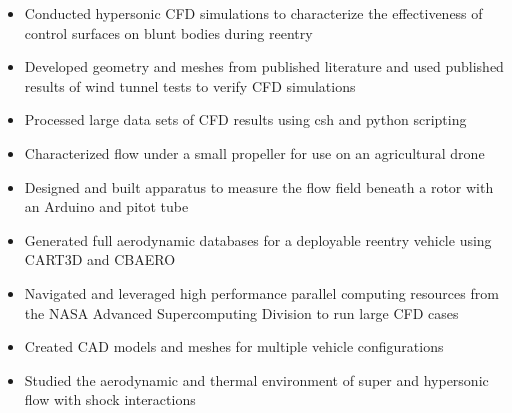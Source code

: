 \documentclass[10pt,ragged2e]{altacv}
\begin{document}

\begin{fullwidth}
  \makecvheader
\end{fullwidth}



\begin{itemize}
  \item Conducted hypersonic CFD simulations to characterize the effectiveness of control surfaces on blunt bodies during reentry
  \item Developed geometry and meshes from published literature and used published results of wind tunnel tests to verify CFD simulations
  \item Processed large data sets of CFD results using csh and python scripting

\end{itemize}

\begin{itemize}
  \item Characterized flow under a small propeller for use on an agricultural drone
  \item Designed and built apparatus to measure the flow field beneath a rotor with an Arduino and pitot tube
\end{itemize}

\addvspace{.14cm}

\divider

\addvspace{.14cm}


\begin{itemize}
  \item Generated full aerodynamic databases for a deployable reentry vehicle using CART3D and CBAERO
  \item Navigated and leveraged high performance parallel computing resources from the NASA Advanced Supercomputing Division to run large CFD cases
  \item Created CAD models and meshes for multiple vehicle configurations
  \item Studied the aerodynamic and thermal environment of super and hypersonic flow with shock interactions
\end{itemize}
\end{document}
